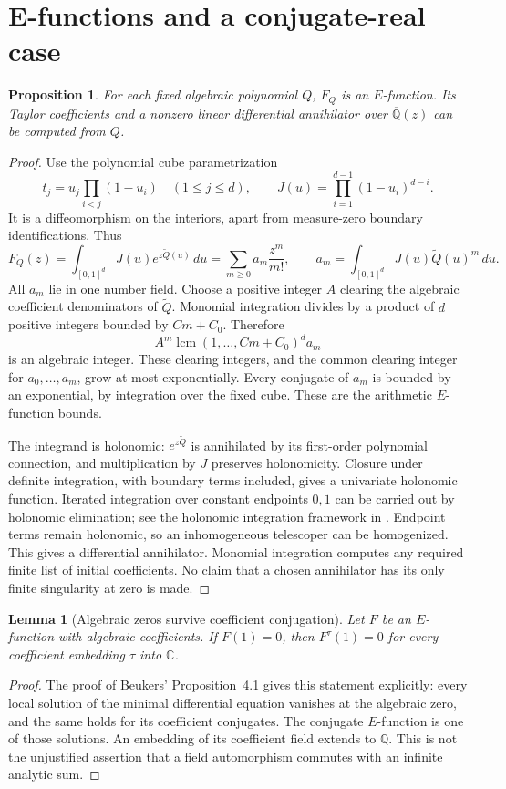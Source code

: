 \documentclass[11pt]{article}
\numberwithin{equation}{section}
\newtheorem{proposition}[proposition]{Proposition}
\newtheorem{lemma}[lemma]{Lemma}
\theoremstyle{definition}
\theoremstyle{remark}
\newcommand{\C}{\mathbb C}
\newcommand{\Qbar}{\overline{\mathbb Q}}
\begin{document}
\section{E-functions and a conjugate-real case}
\begin{proposition}\label{prop:E}
For each fixed algebraic polynomial $Q$, $F_Q$ is an $E$-function.
Its Taylor coefficients and a nonzero linear differential annihilator over
$\Qbar(z)$ can be computed from $Q$.
\end{proposition}
\begin{proof}
Use the polynomial cube parametrization
\[
 t_j=u_j\prod_{i<j}(1-u_i)\quad(1\le j\le d),\qquad
 J(u)=\prod_{i=1}^{d-1}(1-u_i)^{d-i}.
\]
It is a diffeomorphism on the interiors, apart from measure-zero boundary
identifications. Thus
\[
 F_Q(z)=\int_{[0,1]^d}J(u)e^{z\widetilde Q(u)}\,du
       =\sum_{m\ge0}a_m\frac{z^m}{m!},\qquad
 a_m=\int_{[0,1]^d}J(u)\widetilde Q(u)^m\,du.
\]
All $a_m$ lie in one number field. Choose a positive integer $A$ clearing
the algebraic coefficient denominators of $\widetilde Q$. Monomial
integration divides by a product of $d$ positive integers bounded by
$Cm+C_0$. Therefore
\[
 A^m\operatorname{lcm}(1,\ldots,Cm+C_0)^d a_m
\]
is an algebraic integer. These clearing integers, and the common clearing
integer for $a_0,\ldots,a_m$, grow at most exponentially. Every conjugate
of $a_m$ is bounded by an exponential, by integration over the fixed cube.
These are the arithmetic $E$-function bounds.

The integrand is holonomic: $e^{z\widetilde Q}$ is annihilated by its
first-order polynomial connection, and multiplication by $J$ preserves
holonomicity. Closure under definite integration, with boundary terms
included, gives a univariate holonomic function. Iterated integration over
constant endpoints $0,1$ can be carried out by holonomic elimination;
see the holonomic integration framework in \cite{Zeilberger}. Endpoint
terms remain holonomic, so an inhomogeneous telescoper can be homogenized.
This gives a differential annihilator. Monomial integration computes
any required finite list of initial coefficients. No claim that a chosen
annihilator has its only finite singularity at zero is made.
\end{proof}

\begin{lemma}[Algebraic zeros survive coefficient conjugation]\label{lem:conjugation}
Let $F$ be an $E$-function with algebraic coefficients. If $F(1)=0$, then
$F^\tau(1)=0$ for every coefficient embedding $\tau$ into $\C$.
\end{lemma}
\begin{proof}
The proof of Beukers' Proposition~4.1 \cite{Beukers} gives this statement
explicitly: every local solution of the minimal differential equation
vanishes at the algebraic zero, and the same holds for its coefficient
conjugates. The conjugate $E$-function is one of those solutions. An
embedding of its coefficient field extends to $\Qbar$.
This is not the unjustified assertion that a field automorphism commutes
with an infinite analytic sum.
\end{proof}
\end{document}
